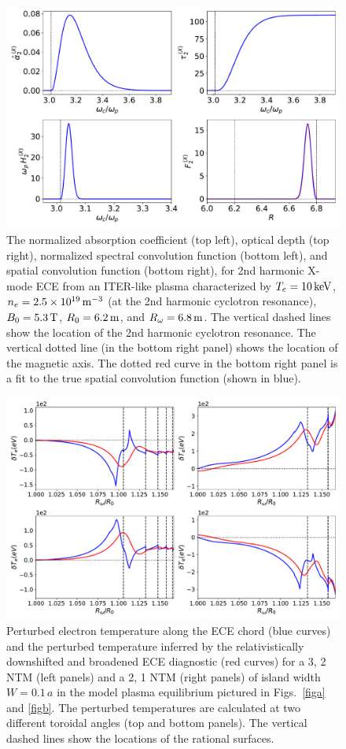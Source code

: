 \documentclass[12pt,prb,aps]{revtex4-1}
\begin{document}
\begin{figure}
\centerline{\includegraphics[width=\textwidth]{X.pdf}}
\caption{The normalized  absorption coefficient (top left), optical depth (top right), normalized
spectral convolution function (bottom left), and spatial convolution function (bottom right), for 2nd  harmonic X-mode ECE from an 
ITER-like plasma characterized by  $T_e=10\,{\rm keV}$, $n_e=2.5\times  10^{19}\,{\rm m}^{-3}$ (at the 2nd harmonic cyclotron resonance), $B_0=5.3\,{\rm T}$, $R_0=6.2\,{\rm m}$, and $R_\omega= 6.8\,{\rm m}$.
The vertical dashed lines show the location of the 2nd harmonic cyclotron resonance.  The vertical dotted line (in the bottom right panel) shows the location of the  magnetic axis.
The dotted red curve in the bottom right panel is a  fit to the true spatial convolution function (shown in blue).
\label{Xmode}}
\end{figure}

\iffalse
\begin{figure}
\centerline{\includegraphics[width=\textwidth]{Fig15.pdf}}
\caption{Perturbed electron temperature along the ECE chord (blue curves) and the perturbed temperature inferred by the relativistically downshifted and  broadened ECE diagnostic (red curves) for a
3, 2 NTM (left panels) and a 2, 1 NTM (right panels) of island width $W=0.1\,a$ in the model plasma equilibrium pictured in Figs.~\ref{figa} and \ref{figb}.
The perturbed temperatures are calculated  at two different toroidal angles (top and bottom panels). 
The vertical dashed lines show the locations of the rational surfaces. 
\label{fig13}}
\end{figure}
\end{document}
